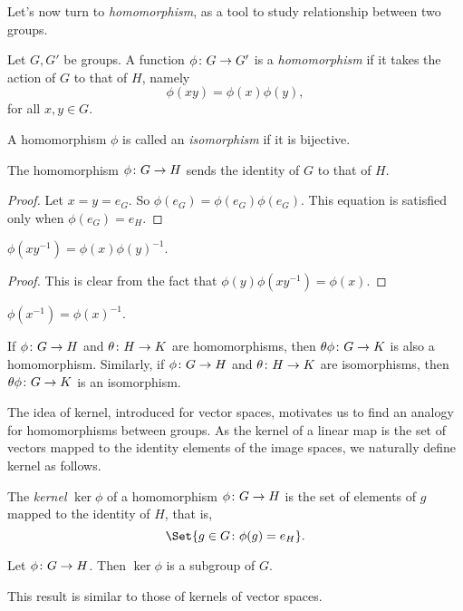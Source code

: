 \documentclass[main.tex]{subfiles}
\begin{document}
			Let's now turn to \textit{homomorphism}, as a tool to study relationship between two groups.
		\begin{definition}
			Let $G, G'$ be groups. A function $\phi \colon G \rightarrow G'$ is a \textit{homomorphism} if it takes the action of $G$ to that of $H$, namely
			\begin{equation*}
					\phi(xy) = \phi(x)\phi(y),
			\end{equation*}
			for all $x, y \in G$.
		\end{definition}
		\begin{definition}
			A homomorphism $\phi$ is called an \textit{isomorphism} if it is bijective.
		\end{definition}
		\begin{lemma}
			The homomorphism $\phi\colon G \rightarrow H$ sends the identity of $G$ to that of $H$.
		\end{lemma}
		\begin{proof}
			Let $x = y = e_G$. So $\phi(e_G) = \phi(e_G)\phi(e_G)$. This equation is satisfied only when $\phi(e_G) = e_{H}$.
		\end{proof}
		\begin{lemma}
			$\phi(xy^{-1}) = \phi(x)\phi(y)^{-1}$.
		\end{lemma}
		\begin{proof}
			This is clear from the fact that $\phi(y)\phi(xy^{-1}) = \phi(x)$.
		\end{proof}
		\begin{lemma}
			$\phi(x^{-1}) = \phi(x)^{-1}$.
		\end{lemma}
		\begin{lemma}
			If $\phi\colon G \rightarrow H$ and $\theta\colon H \rightarrow K$ are homomorphisms, then $\theta\phi\colon G \rightarrow K$ is also a homomorphism. Similarly, if $\phi\colon G \rightarrow H$ and $\theta\colon H \rightarrow K$ are isomorphisms, then $\theta\phi\colon G \rightarrow K$ is an isomorphism.
		\end{lemma}
		The idea of kernel, introduced for vector spaces, motivates us to find an analogy for homomorphisms between groups. As the kernel of a linear map is the set of vectors mapped to the identity elements of the image spaces, we naturally define kernel as follows.
		\begin{definition}
			The \textit{kernel} $\ker\phi$ of a homomorphism $\phi\colon G \rightarrow H$ is the set of elements of $g$ mapped to the identity of $H$, that is,
			\begin{equation*}
				\Set{g \in G \colon \phi(g) = e_H}.
			\end{equation*}
		\end{definition}
		\begin{theorem}
			Let $\phi\colon G \rightarrow H$. Then $\ker\phi$ is a subgroup of $G$.
		\end{theorem}
		This result is similar to those of kernels of vector spaces.
\end{document}
